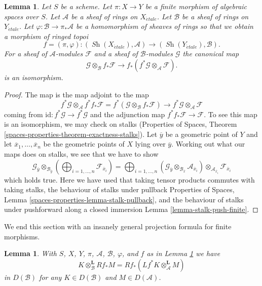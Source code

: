 \documentclass{stacks-project}
\theoremstyle{plain}
\newtheorem{lemma}[subsection]{Lemma}
\theoremstyle{definition}
\theoremstyle{remark}
\numberwithin{equation}{subsection}
\def\Sh{\mathop{\mathit{Sh}}\nolimits}
\def\etale{{\acute{e}tale}}
\begin{document}
\begin{lemma}
\label{lemma-finite-rings}
Let $S$ be a scheme. Let $\pi : X \to Y$ be a finite morphism of algebraic
spaces over $S$. Let $\mathcal{A}$ be a sheaf of rings on $X_\etale$.
Let $\mathcal{B}$ be a sheaf of rings on $Y_\etale$.
Let $\varphi : \mathcal{B} \to \pi_*\mathcal{A}$
be a homomorphism of sheaves of rings so that we obtain a
morphism of ringed topoi
$$
f = (\pi, \varphi) :
(\Sh(X_\etale), \mathcal{A})
\longrightarrow
(\Sh(Y_\etale), \mathcal{B}).
$$
For a sheaf of $\mathcal{A}$-modules $\mathcal{F}$ and a
sheaf of $\mathcal{B}$-modules $\mathcal{G}$ the canonical map
$$
\mathcal{G} \otimes_\mathcal{B} f_*\mathcal{F}
\longrightarrow
f_*(f^*\mathcal{G} \otimes_\mathcal{A} \mathcal{F}).
$$
is an isomorphism.
\end{lemma}

\begin{proof}
The map is the map adjoint to the map
$$
f^*\mathcal{G} \otimes_\mathcal{A}
f^* f_*\mathcal{F} =
f^*(\mathcal{G} \otimes_\mathcal{B} f_*\mathcal{F})
\longrightarrow
f^*\mathcal{G} \otimes_\mathcal{A} \mathcal{F}
$$
coming from $\text{id} : f^*\mathcal{G} \to f^*\mathcal{G}$
and the adjunction map $f^* f_*\mathcal{F} \to \mathcal{F}$.
To see this map is an isomorphism, we may check on stalks
(Properties of Spaces, Theorem
\ref{spaces-properties-theorem-exactness-stalks}).
Let $\overline{y}$ be a geometric point of $Y$ and
let $\overline{x}_1, \ldots, \overline{x}_n$ be the geometric
points of $X$ lying over $\overline{y}$.
Working out what our maps does on stalks, we see that we
have to show
$$
\mathcal{G}_{\overline{y}}
\otimes_{\mathcal{B}_{\overline{y}}}
\left(
\bigoplus\nolimits_{i = 1, \ldots, n} \mathcal{F}_{\overline{x}_i}
\right) =
\bigoplus\nolimits_{i = 1, \ldots, n}
(\mathcal{G}_{\overline{y}}
\otimes_{\mathcal{B}_{\overline{x}}}
\mathcal{A}_{\overline{x}_i}) \otimes_{\mathcal{A}_{\overline{x}_i}}
\mathcal{F}_{\overline{x}_i}
$$
which holds true. Here we have used that
taking tensor products commutes with taking stalks, the
behaviour of stalks under pullback
Properties of Spaces, Lemma \ref{spaces-properties-lemma-stalk-pullback}, and
the behaviour of stalks under pushforward along a closed immersion
Lemma \ref{lemma-stalk-push-finite}.
\end{proof}

\noindent
We end this section with an insanely general projection formula
for finite morphisms.

\begin{lemma}
\label{lemma-projection-formula-finite}
With $S$, $X$, $Y$, $\pi$, $\mathcal{A}$, $\mathcal{B}$, $\varphi$, and $f$
as in Lemma \ref{lemma-finite-rings} we have
$$
K \otimes_\mathcal{B}^\mathbf{L} Rf_*M =
Rf_*(Lf^*K \otimes_\mathcal{A}^\mathbf{L} M)
$$
in $D(\mathcal{B})$ for any $K \in D(\mathcal{B})$ and
$M \in D(\mathcal{A})$.
\end{lemma}
\end{document}
